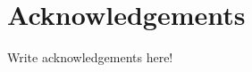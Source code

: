 \documentclass[../phdthesis.tex]{subfiles}
\begin{document}
\ifSubfilesClassLoaded{\backmatter}{}
\chapter{Acknowledgements}
Write acknowledgements here!
\end{document}
